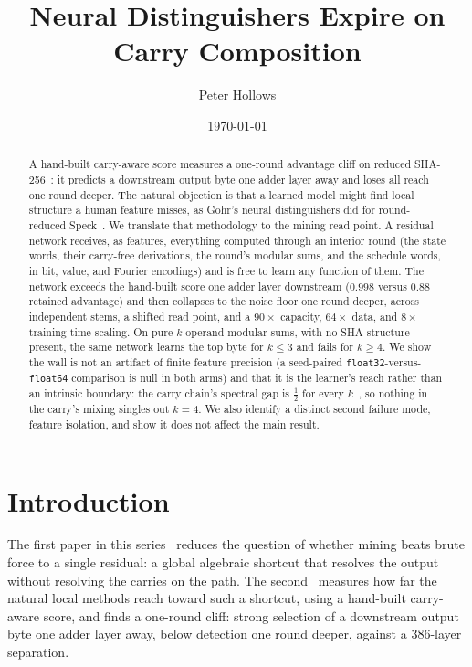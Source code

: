\documentclass[11pt]{article}
\title{\textbf{Neural Distinguishers Expire on Carry Composition}}
\author{Peter Hollows}
\date{\today}
\begin{document}
\maketitle

\begin{abstract}
A hand-built carry-aware score measures a one-round advantage cliff on
reduced SHA-256~\cite{paperII}: it predicts a downstream output byte one
adder layer away and loses all reach one round deeper. The natural
objection is that a learned model might find local structure a human
feature misses, as Gohr's neural distinguishers did for round-reduced
Speck~\cite{gohr}. We translate that methodology to the mining read point.
A residual network receives, as features, everything computed through an
interior round (the state words, their carry-free derivations, the round's
modular sums, and the schedule words, in bit, value, and Fourier
encodings) and is free to learn any function of them. The network exceeds
the hand-built score one adder layer downstream ($0.998$ versus $0.88$
retained advantage) and then collapses to the noise floor one round deeper,
across independent stems, a shifted read point, and a $90\times$ capacity,
$64\times$ data, and $8\times$ training-time scaling. On pure $k$-operand
modular sums, with no SHA structure present, the same network learns the
top byte for $k\le3$ and fails for $k\ge4$. We show the wall is not an
artifact of finite feature precision (a seed-paired
\texttt{float32}-versus-\texttt{float64} comparison is null in both arms)
and that it is the learner's reach rather than an intrinsic boundary: the
carry chain's spectral gap is $\tfrac12$ for every $k$~\cite{paperII}, so
nothing in the carry's mixing singles out $k=4$. We also identify a
distinct second failure mode, feature isolation, and show it does not
affect the main result.
\end{abstract}

\section{Introduction}

The first paper in this series~\cite{paperI} reduces the question of
whether mining beats brute force to a single residual: a global algebraic
shortcut that resolves the output without resolving the carries on the
path. The second~\cite{paperII} measures how far the natural local methods
reach toward such a shortcut, using a hand-built carry-aware score, and
finds a one-round cliff: strong selection of a downstream output byte one
adder layer away, below detection one round deeper, against a $386$-layer
separation.
\end{document}
